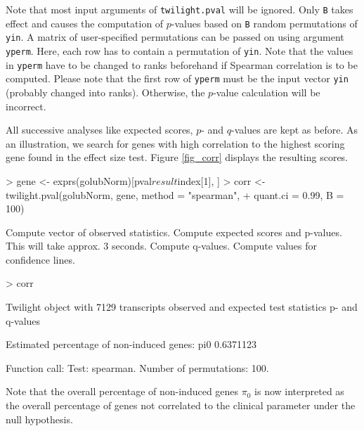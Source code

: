 \documentclass[11pt,a4paper,fleqn]{report}
\newcommand{\Rfunction}[1]{{\texttt{#1}}}
\newcommand{\Rfunarg}[1]{{\texttt{#1}}}
\begin{document}
Note that most input arguments of \Rfunction{twilight.pval} will be ignored. Only \Rfunarg{B} takes effect and causes the computation of $p$-values based on \Rfunarg{B} random permutations of \Rfunarg{yin}. A matrix of user-specified permutations can be passed on using argument \Rfunarg{yperm}. Here, each row has to contain a permutation of \Rfunarg{yin}. Note that the values in \Rfunarg{yperm} have to be changed to ranks beforehand if Spearman correlation is to be computed. Please note that the first row of \Rfunarg{yperm} must be the input vector \Rfunarg{yin} (probably changed into ranks). Otherwise, the $p$-value calculation will be incorrect.

All successive analyses like expected scores, $p$- and $q$-values are kept as before. As an illustration, we search for genes with high correlation to the highest scoring gene found in the effect size test. Figure \ref{fig_corr} displays the resulting scores.

\begin{Schunk}
\begin{Sinput}
> gene <- exprs(golubNorm)[pval$result$index[1], ]
> corr <- twilight.pval(golubNorm, gene, method = "spearman", 
+     quant.ci = 0.99, B = 100)
\end{Sinput}
\begin{Soutput}
Compute vector of observed statistics. 
Compute expected scores and p-values. This will take approx. 3 seconds. 
Compute q-values. 
Compute values for confidence lines. 
\end{Soutput}
\begin{Sinput}
> corr
\end{Sinput}
\begin{Soutput}
 Twilight object with
     7129 transcripts
     observed and expected test statistics
     p- and q-values

 Estimated percentage of non-induced genes:
      pi0 
0.6371123 

 Function call:
 Test: spearman. Number of permutations: 100. 
\end{Soutput}
\end{Schunk}

Note that the overall percentage of non-induced genes $\pi_0$ is now interpreted as the overall percentage of genes not correlated to the clinical parameter under the null hypothesis.
\end{document}
